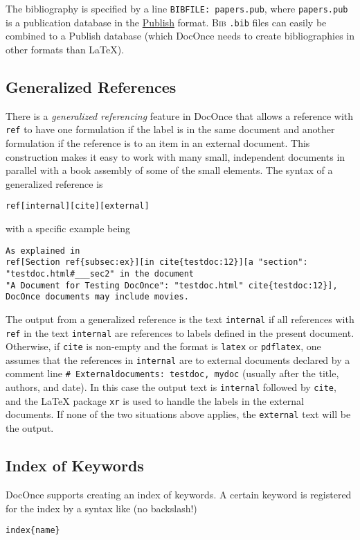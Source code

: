 \documentclass[%
oneside,                 %
final,                   %
10pt]{article}
\newcounter{doconce:movie:counter}
\begin{document}
The bibliography is specified by a line \texttt{BIBFILE: papers.pub},
where \texttt{papers.pub} is a publication database in the
\href{{https://github.com/doconce/publish}}{Publish} format.
\textsc{Bib}\negthinspace{\TeX} \texttt{.bib} files can easily be combined to a Publish database
(which DocOnce needs to create bibliographies in other formats
than {\LaTeX}).
\subsection{Generalized References}
There is a \emph{generalized referencing} feature in DocOnce that allows
a reference with \texttt{ref} to have one formulation if the label is
in the same document and another formulation if the reference is
to an item in an external document. This construction makes it easy
to work with many small, independent documents in parallel with
a book assembly of some of the small elements.
The syntax of a generalized reference is
\begin{Verbatim}[numbers=none,fontsize=\fontsize{9pt}{9pt},baselinestretch=0.95,xleftmargin=2mm]
ref[internal][cite][external]

\end{Verbatim}

with a specific example being
\begin{Verbatim}[numbers=none,fontsize=\fontsize{9pt}{9pt},baselinestretch=0.95,xleftmargin=2mm]
As explained in
ref[Section ref{subsec:ex}][in cite{testdoc:12}][a "section":
"testdoc.html#___sec2" in the document
"A Document for Testing DocOnce": "testdoc.html" cite{testdoc:12}],
DocOnce documents may include movies.

\end{Verbatim}

The output from a generalized reference is the text \texttt{internal} if all
references with \texttt{ref} in the text \texttt{internal} are references to labels
defined in the
present document. Otherwise, if \texttt{cite} is non-empty and the format is
\texttt{latex} or \texttt{pdflatex}, one assumes that the references in \texttt{internal}
are to external documents declared by a comment line
\Verb!# Externaldocuments: testdoc, mydoc! (usually after the title, authors,
and date). In this case the output text is \texttt{internal} followed by \texttt{cite},
and the
{\LaTeX} package \texttt{xr} is used to handle the labels in the external
documents.  If none of the two situations above applies, the
\texttt{external} text will be the output.
\subsection{Index of Keywords}
DocOnce supports creating an index of keywords. A certain keyword
is registered for the index by a syntax like (no
backslash!)
\begin{Verbatim}[numbers=none,fontsize=\fontsize{9pt}{9pt},baselinestretch=0.95,xleftmargin=2mm]
index{name}

\end{Verbatim}
\end{document}
